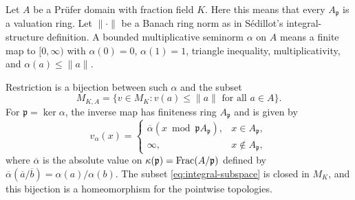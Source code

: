 Let $A$ be a Pr\"ufer domain with fraction field $K$. Here this means that
every $A_{\mathfrak p}$ is a valuation ring. Let $\|\cdot\|$ be a Banach
ring norm as in S\'edillot's integral-structure definition. A bounded
multiplicative seminorm $\alpha$ on $A$ means a finite map to
$[0,\infty)$ with $\alpha(0)=0$, $\alpha(1)=1$, triangle inequality,
multiplicativity, and $\alpha(a)\le\|a\|$.

\begin{proposition}
\label{prop:integral}
Restriction is a bijection between such $\alpha$ and the subset
\[
 M_{K,A}=\{v\in M_K:v(a)\le\|a\|\text{ for all }a\in A\}.
 \tag{AV4.1}\label{eq:integral-subspace}
\]
For $\mathfrak p=\ker\alpha$, the inverse map has finiteness ring
$A_{\mathfrak p}$ and is given by
\[
 v_\alpha(x)=
 \begin{cases}
  \overline\alpha(x\bmod\mathfrak p A_{\mathfrak p}),&x\in A_{\mathfrak p},\\
  \infty,&x\notin A_{\mathfrak p},
 \end{cases}
 \tag{AV4.2}\label{eq:extension}
\]
where $\overline\alpha$ is the absolute value on
$\kappa(\mathfrak p)=\operatorname{Frac}(A/\mathfrak p)$ defined by
$\overline\alpha(\overline a/\overline b)=\alpha(a)/\alpha(b)$.
The subset \eqref{eq:integral-subspace} is closed in $M_K$, and this
bijection is a homeomorphism for the pointwise topologies.
\end{proposition}
